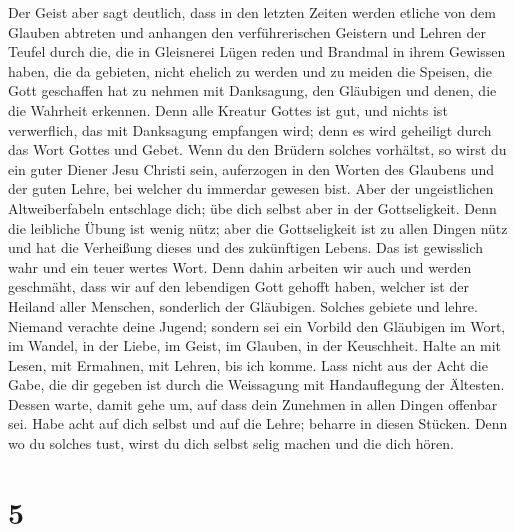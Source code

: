  Der Geist aber sagt deutlich, dass in den letzten Zeiten
werden etliche von dem Glauben abtreten und anhangen den verführerischen
Geistern und Lehren der Teufel  durch die, die in
Gleisnerei Lügen reden und Brandmal in ihrem Gewissen haben,
 die da gebieten, nicht ehelich zu werden und zu meiden
die Speisen, die Gott geschaffen hat zu nehmen mit Danksagung, den
Gläubigen und denen, die die Wahrheit erkennen.  Denn alle
Kreatur Gottes ist gut, und nichts ist verwerflich, das mit Danksagung
empfangen wird;  denn es wird geheiligt durch das Wort
Gottes und Gebet.  Wenn du den Brüdern solches vorhältst,
so wirst du ein guter Diener Jesu Christi sein, auferzogen in den Worten
des Glaubens und der guten Lehre, bei welcher du immerdar gewesen bist.
 Aber der ungeistlichen Altweiberfabeln entschlage dich;
übe dich selbst aber in der Gottseligkeit.  Denn die
leibliche Übung ist wenig nütz; aber die Gottseligkeit ist zu allen
Dingen nütz und hat die Verheißung dieses und des zukünftigen Lebens.
 Das ist gewisslich wahr und ein teuer wertes Wort.
 Denn dahin arbeiten wir auch und werden geschmäht, dass
wir auf den lebendigen Gott gehofft haben, welcher ist der Heiland aller
Menschen, sonderlich der Gläubigen.  Solches gebiete und
lehre.  Niemand verachte deine Jugend; sondern sei ein
Vorbild den Gläubigen im Wort, im Wandel, in der Liebe, im Geist, im
Glauben, in der Keuschheit.  Halte an mit Lesen, mit
Ermahnen, mit Lehren, bis ich komme.  Lass nicht aus der
Acht die Gabe, die dir gegeben ist durch die Weissagung mit
Handauflegung der Ältesten.  Dessen warte, damit gehe um,
auf dass dein Zunehmen in allen Dingen offenbar sei. 
Habe acht auf dich selbst und auf die Lehre; beharre in diesen Stücken.
Denn wo du solches tust, wirst du dich selbst selig machen und die dich
hören.

\hypertarget{section-4}{%
\section{5}\label{section-4}}

